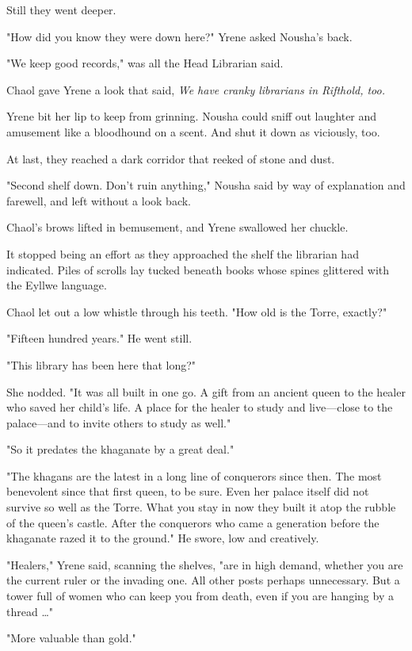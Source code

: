 Still they went deeper.

"How did you know they were down here?" Yrene asked Nousha's back.

"We keep good records," was all the Head Librarian said.

Chaol gave Yrene a look that said, \emph{We have cranky librarians in Rifthold, too.}

Yrene bit her lip to keep from grinning. Nousha could sniff out laughter and amusement like a bloodhound on a scent. And shut it down as viciously, too.

At last, they reached a dark corridor that reeked of stone and dust.

"Second shelf down. Don't ruin anything," Nousha said by way of explanation and farewell, and left without a look back.

Chaol's brows lifted in bemusement, and Yrene swallowed her chuckle.

It stopped being an effort as they approached the shelf the librarian had indicated. Piles of scrolls lay tucked beneath books whose spines glittered with the Eyllwe language.

Chaol let out a low whistle through his teeth. "How old is the Torre, exactly?"

"Fifteen hundred years." He went still.

"This library has been here that long?"

She nodded. "It was all built in one go. A gift from an ancient queen to the healer who saved her child's life. A place for the healer to study and live---close to the palace---and to invite others to study as well."

"So it predates the khaganate by a great deal."

"The khagans are the latest in a long line of conquerors since then. The most benevolent since that first queen, to be sure. Even her palace itself did not survive so well as the Torre. What you stay in now
 they built it atop the rubble of the queen's castle. After the conquerors who came a generation before the khaganate razed it to the ground." He swore, low and creatively.

"Healers," Yrene said, scanning the shelves, "are in high demand, whether you are the current ruler or the invading one. All other posts
 perhaps unnecessary. But a tower full of women who can keep you from death, even if you are hanging by a thread \ldots"

"More valuable than gold."

